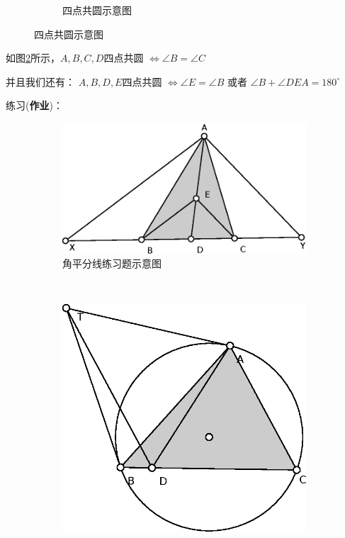 \documentclass{article}
\begin{document}
\begin{enumerate}
\begin{figure}[!ht]
\begin{subfigure}[b]{0.45\textwidth}
    \caption{四点共圆示意图}\label{fig:Inscribed_angles2}
    \end{subfigure}
    \end{figure}

如图\ref{fig:Inscribed_angles2}所示，$A,B,C,D$四点共圆 $\Leftrightarrow\angle B=\angle C$

并且我们还有： $A,B,D,E$四点共圆 $\Leftrightarrow \angle E=\angle B$ 或者 $\angle B+\angle DEA =180^{\circ}$

练习(\textbf{作业})：
    \begin{figure}[!ht]
    \centering
    \begin{subfigure}[b]{0.31\textwidth}
    \includegraphics[width=\textwidth]{first_1.eps}
    \caption{角平分线练习题示意图}\label{fig:first_1}
    \end{subfigure}~
    \begin{subfigure}[b]{0.31\textwidth}
    \includegraphics[width=\textwidth]{first_2.eps}

\end{subfigure}
\end{figure}
\end{enumerate}
\end{document}
